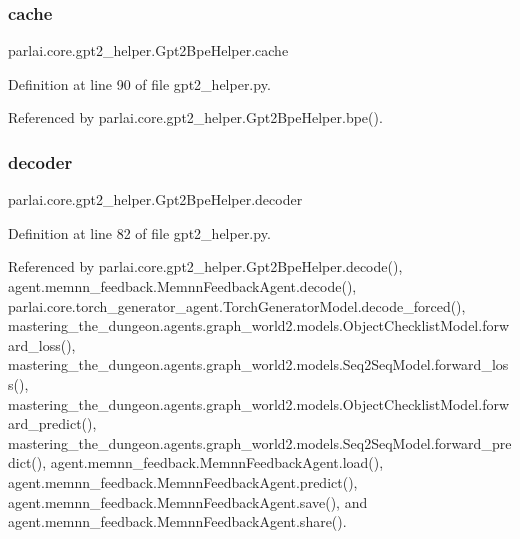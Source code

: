\subsubsection{\texorpdfstring{cache}{cache}}
{\footnotesize\ttfamily parlai.\+core.\+gpt2\+\_\+helper.\+Gpt2\+Bpe\+Helper.\+cache}



Definition at line 90 of file gpt2\+\_\+helper.\+py.



Referenced by parlai.\+core.\+gpt2\+\_\+helper.\+Gpt2\+Bpe\+Helper.\+bpe().

\mbox{\label{classparlai_1_1core_1_1gpt2__helper_1_1Gpt2BpeHelper_a26ab20eb1b181e46035f2164513d8fce}} 
\subsubsection{\texorpdfstring{decoder}{decoder}}
{\footnotesize\ttfamily parlai.\+core.\+gpt2\+\_\+helper.\+Gpt2\+Bpe\+Helper.\+decoder}



Definition at line 82 of file gpt2\+\_\+helper.\+py.



Referenced by parlai.\+core.\+gpt2\+\_\+helper.\+Gpt2\+Bpe\+Helper.\+decode(), agent.\+memnn\+\_\+feedback.\+Memnn\+Feedback\+Agent.\+decode(), parlai.\+core.\+torch\+\_\+generator\+\_\+agent.\+Torch\+Generator\+Model.\+decode\+\_\+forced(), mastering\+\_\+the\+\_\+dungeon.\+agents.\+graph\+\_\+world2.\+models.\+Object\+Checklist\+Model.\+forward\+\_\+loss(), mastering\+\_\+the\+\_\+dungeon.\+agents.\+graph\+\_\+world2.\+models.\+Seq2\+Seq\+Model.\+forward\+\_\+loss(), mastering\+\_\+the\+\_\+dungeon.\+agents.\+graph\+\_\+world2.\+models.\+Object\+Checklist\+Model.\+forward\+\_\+predict(), mastering\+\_\+the\+\_\+dungeon.\+agents.\+graph\+\_\+world2.\+models.\+Seq2\+Seq\+Model.\+forward\+\_\+predict(), agent.\+memnn\+\_\+feedback.\+Memnn\+Feedback\+Agent.\+load(), agent.\+memnn\+\_\+feedback.\+Memnn\+Feedback\+Agent.\+predict(), agent.\+memnn\+\_\+feedback.\+Memnn\+Feedback\+Agent.\+save(), and agent.\+memnn\+\_\+feedback.\+Memnn\+Feedback\+Agent.\+share().

